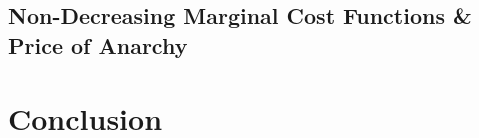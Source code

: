 \documentclass{beamer}
\begin{document}
\subsection{Non-Decreasing Marginal Cost Functions \& Price of Anarchy}
\begin{frame}
\end{frame}

\section{Conclusion}
\begin{frame}
\end{frame}
\end{document}
